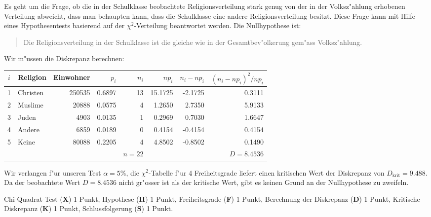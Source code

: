 \begin{loesung}
Es geht um die Frage, ob die in der Schulklasse beobachtete Religionsverteilung
stark genug von der in der Volksz"ahlung erhobenen Verteilung abweicht,
dass man behaupten kann, dass die Schulklasse eine andere Religionsverteilung
besitzt.
Diese Frage kann mit Hilfe eines Hypothesentests basierend auf der
$\chi^2$-Verteilung beantwortet werden. Die Nullhypothese ist:
\begin{quotation}
\parindent 0pt
Die Religionsverteilung in der Schulklasse ist die gleiche wie in
der Gesamtbev"olkerung gem"ass Volksz"ahlung.
\end{quotation}
Wir m"ussen die Diskrepanz berechnen:
\begin{center}
\begin{tabular}{|c|l|r|r|r|r|r|r|}
\hline
$i$&Religion&Einwohner&$p_i$    &$n_i$&$np_i$    &$n_i-np_i$&$(n_i-np_i)^2/np_i$\\
\hline
1  &Christen&   250535&0.6897   &   13&15.1725   &-2.1725   &0.3111\\
2  & Muslime&    20888&0.0575   &    4& 1.2650   & 2.7350   &5.9133\\
3  &   Juden&     4903&0.0135   &    1& 0.2969   & 0.7030   &1.6647\\
4  &  Andere&     6859&0.0189   &    0& 0.4154   &-0.4154   &0.4154\\
5  &   Keine&    80088&0.2205   &    4& 4.8502   &-0.8502   &0.1490\\
\hline
   &        &         &         &$n=22$&         &          &$D=8.4536$\\
\hline
\end{tabular}
\end{center}
Wir verlangen f"ur unseren Test $\alpha=5\%$, die $\chi^2$-Tabelle
f"ur 4 Freiheitsgrade liefert einen kritischen Wert der Diskrepanz
von $D_{\text{krit}}=9.488$. Da der beobachtete Wert $D=8.4536$
nicht gr"osser ist als der kritische Wert, gibt es keinen Grund an
der Nullhypothese zu zweifeln.
\end{loesung}

\begin{bewertung}
Chi-Quadrat-Test ({\bf X}) 1 Punkt,
Hypothese ({\bf H}) 1 Punkt,
Freiheitsgrade ({\bf F}) 1 Punkt,
Berechnung der Diskrepanz ({\bf D}) 1 Punkt,
Kritische Diskrepanz ({\bf K}) 1 Punkt,
Schlussfolgerung ({\bf S}) 1 Punkt.
\end{bewertung}
